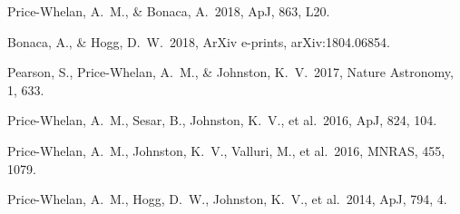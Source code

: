 \documentclass{article}
\begin{document}
\begin{publications}
    Price-Whelan, A.~M., \& Bonaca, A.\ 2018, ApJ, 863, L20.

    Bonaca, A., \& Hogg, D.~W.\ 2018, ArXiv e-prints, arXiv:1804.06854.

    Pearson, S., Price-Whelan, A.~M., \& Johnston, K.~V.\ 2017, Nature Astronomy, 1, 633.

    Price-Whelan, A.~M., Sesar, B., Johnston, K.~V., et al.\ 2016, ApJ, 824, 104.

    Price-Whelan, A.~M., Johnston, K.~V., Valluri, M., et al.\ 2016, MNRAS, 455, 1079.

    Price-Whelan, A.~M., Hogg, D.~W., Johnston, K.~V., et al.\ 2014, ApJ, 794, 4.
\end{publications}

\begin{relationto}
\relatobs{}{}{}{}
\relatobs{}{}{}{}
\relatobs{}{}{}{}
\relatobs{}{}{}{}
\relatobs{}{}{}{}
\end{relationto}

\begin{previoususe}
\pastrun{}{}{}{}{}
\pastrun{}{}{}{}{}
\pastrun{}{}{}{}{}
\pastrun{}{}{}{}{}
\pastrun{}{}{}{}{}
\pastrun{}{}{}{}{}
\end{previoususe}

\experience{}



\begin{observingrun}
\run{}{}{}{}{}{}{}
\run{}{}{}{}{}{}{}
\run{}{}{}{}{}{}{}
\orcomment{}
\end{observingrun}

\instruments{}
\end{document}
